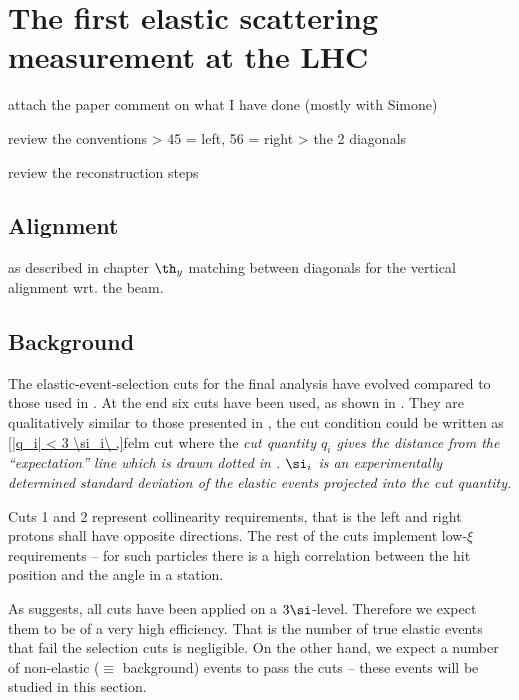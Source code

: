 \iffalse
DPE, SD, MC
\fi

\chapter[felm]{The first elastic scattering measurement at the LHC}

\> attach the paper 
\> comment on what I have done (mostly with Simone)

\> review the conventions
\>> 45 = left, 56 = right
\>> the 2 diagonals

\> review the reconstruction steps

\section{Alignment}

\> as described in chapter 
\> $\th_y$ matching between diagonals for the vertical alignment wrt. the beam.

\section{Background}

The elastic-event-selection cuts for the final analysis have evolved compared to those used in . At the end six cuts have been used, as shown in . They are qualitatively similar to those presented in , the cut condition could be written as
\eqref{|q_i| < 3 \si_i\ ,}{felm cut}
where the \em{cut quantity} $q_i$ gives the distance from the ``expectation'' line which is drawn dotted in . $\si_i$ is an experimentally determined standard deviation of the elastic events projected into the cut quantity.

Cuts 1 and 2 represent collinearity requirements, that is the left and right protons shall have opposite directions. The rest of the cuts implement low-$\xi$ requirements -- for such particles there is a high correlation between the hit position and the angle in a station.


As  suggests, all cuts have been applied on a $3\si$-level. Therefore we expect them to be of a very high efficiency. That is the number of true elastic events that fail the selection cuts is negligible. On the other hand, we expect a number of non-elastic ($\equiv$ background) events to pass the cuts -- these events will be studied in this section.

